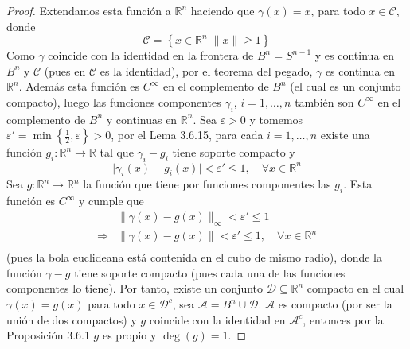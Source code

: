 \documentclass[12pt]{report}
\theoremstyle{largebreak}
\newcommand\abs[1]{\ensuremath{\lvert#1\rvert}}
\newcommand\cf[3]{\ensuremath{#1:#2\rightarrow#3}}
\begin{document}
\begin{proof}
    Extendamos esta función a $\mathbb{R}^n$ haciendo que $\gamma(x)=x$, para todo $x\in\mathcal{C}$, donde
    \begin{equation*}
        \mathcal{C}=\left\{x\in\mathbb{R}^n|\|x\|\geq1\right\}
    \end{equation*}
    Como $\gamma$ coincide con la identidad en la frontera de $B^n=S^{n-1}$ y es continua en $B^n$ y $\mathcal{C}$ (pues en $\mathcal{C}$ es la identidad), por el teorema del pegado, $\gamma$ es continua en $\mathbb{R}^n$. Además esta función es $C^\infty$ en el complemento de $B^n$ (el cual es un conjunto compacto), luego las funciones componentes $\gamma_i$, $i=1,\dots,n$ también son $C^\infty$ en el complemento de $B^n$ y continuas en $\mathbb{R}^n$.
    Sea $\varepsilon>0$ y tomemos $\varepsilon'=\min\left\{\frac{1}{2},\varepsilon\right\}>0$, por el Lema 3.6.15, para cada $i=1,\dots,n$ existe una función $\cf{g_i}{\mathbb{R}^n}{\mathbb{R}}$ tal que $\gamma_i-g_i$ tiene soporte compacto y
    \begin{equation*}
        \abs{\gamma_i(x)-g_i(x)}<\varepsilon'\leq1,\quad\forall x\in\mathbb{R}^n
    \end{equation*}
    Sea $\cf{g}{\mathbb{R}^n}{\mathbb{R}^n}$ la función que tiene por funciones componentes las $g_i$. Esta función es $C^\infty$ y cumple que
    \begin{equation*}
        \begin{split}
            &\|\gamma(x)-g(x)\|_{\infty}< \varepsilon'\leq1\\
            \Rightarrow &\|\gamma(x)-g(x)\|< \varepsilon'\leq1,\quad\forall x\in\mathbb{R}^n\\
        \end{split}
    \end{equation*}
    (pues la bola euclideana está contenida en el cubo de mismo radio), donde la función $\gamma-g$ tiene soporte compacto (pues cada una de las funciones componentes lo tiene). Por tanto, existe un conjunto $\mathcal{D}\subseteq\mathbb{R}^n$ compacto en el cual $\gamma(x)=g(x)$ para todo $x\in\mathcal{D}^c$, sea $\mathcal{A}=B^n\cup\mathcal{D}$. $\mathcal{A}$ es compacto (por ser la unión de dos compactos) y $g$ coincide con la identidad en $\mathcal{A}^c$, entonces por la Proposición 3.6.1 $g$ es propio y $\deg(g)=1$.
    

\end{proof}
\end{document}
